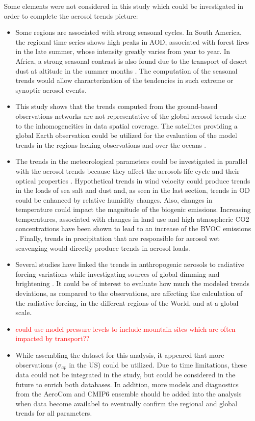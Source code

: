 \documentclass[journal abbreviation, manuscript]{copernicus}
\begin{document}
Some elements were not considered in this study which could be investigated in order to complete the aerosol trends picture:
\begin{itemize}
 \item Some regions are associated with strong seasonal cycles. In South America, the regional time series shows high peaks in AOD, associated with forest fires in the late summer, whose intensity greatly varies from year to year. In Africa, a strong seasonal contrast is also found due to the transport of desert dust at altitude in the summer months \citep{mortier2016, ogunjobi2008synoptic}. The computation of the seasonal trends would allow characterization of the tendencies in such extreme or synoptic aerosol events.
 \item  This study shows that the trends computed from the ground-based observations networks are not representative of the global aerosol trends due to the inhomogeneities in data spatial coverage. The satellites providing a global Earth observation could be utilized for the evaluation of the model trends in the regions lacking observations and over the oceans \citep{hsu2012global,zhang2010decadal}.
 \item The trends in the meteorological parameters could be investigated in parallel with the aerosol trends because they affect the aerosols life cycle and their optical properties \citep{che2019large}. Hypothetical trends in wind velocity could produce trends in the loads of sea salt and dust and, as seen in the last section, trends in OD could be enhanced by relative humidity changes. Also, changes in temperature could impact the magnitude of the biogenic emissions. Increasing temperatures, associated with changes in land use and high atmospheric CO2 concentrations have been shown to lead to an increase of the BVOC emissions \citep{penuelas2010bvocs}. Finally, trends in precipitation that are responsible for aerosol wet scavenging would directly produce trends in aerosol loads.
 \item Several studies have linked the trends in anthropogenic aerosols to radiative forcing variations while investigating sources of global dimming and brightening \cite{streets2006two,norris2007trends}. It could be of interest to evaluate how much the modeled trends deviations, as compared to the observations, are affecting the calculation of the radiative forcing, in the different regions of the World, and at a global scale.
 \item \textcolor{red}{could use model pressure levels to include mountain sites which are often impacted by transport??}
 \item While assembling the dataset for this analysis, it appeared that more observations ($\sigma_{ap}$ in the US) could be utilized. Due to time limitations, these data could not be integrated in the study, but could be considered in the future to enrich both databases. In addition, more models and diagnostics from the AeroCom and CMIP6 ensemble should be added into the analysis when data become availabel to eventually confirm the regional and global trends for all parameters.
\end{itemize}
\end{document}
